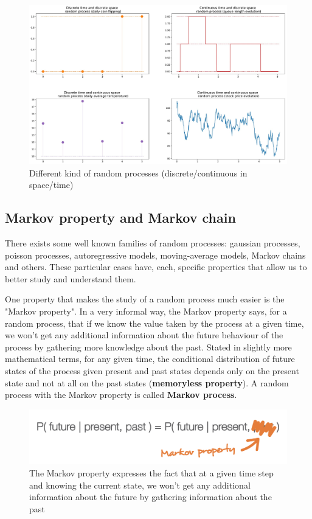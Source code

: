 \begin{figure}[h]
    \centering
\includegraphics[width=\textwidth]{pic/p05c07-snip01.png}
    \caption{Different kind of random processes (discrete/continuous in space/time)}
    \label{fig:p05c07-snip01}
\end{figure}


\subsection{Markov property and Markov chain}

There exists some well known families of random processes: gaussian processes, poisson processes, autoregressive models, moving-average models, Markov chains and others. These particular cases have, each, specific properties that allow us to better study and understand them.

One property that makes the study of a random process much easier is the "Markov property". In a very informal way, the Markov property says, for a random process, that if we know the value taken by the process at a given time, we won't get any additional information about the future behaviour of the process by gathering more knowledge about the past. Stated in slightly more mathematical terms, for any given time, the conditional distribution of future states of the process given present and past states depends only on the present state and not at all on the past states (\textbf{memoryless property}). A random process with the Markov property is called \textbf{Markov process}.



\begin{figure}[h]
    \centering
\includegraphics[width=\textwidth]{pic/p05c07-snip02.png}
    \caption[The Markov does not learn about the future by gathering information about the past]{The Markov property expresses the fact that at a given time step and knowing the current state, we won't get any additional information about the future by gathering information about the past}
    \label{fig:p05c07-snip02}
\end{figure}




